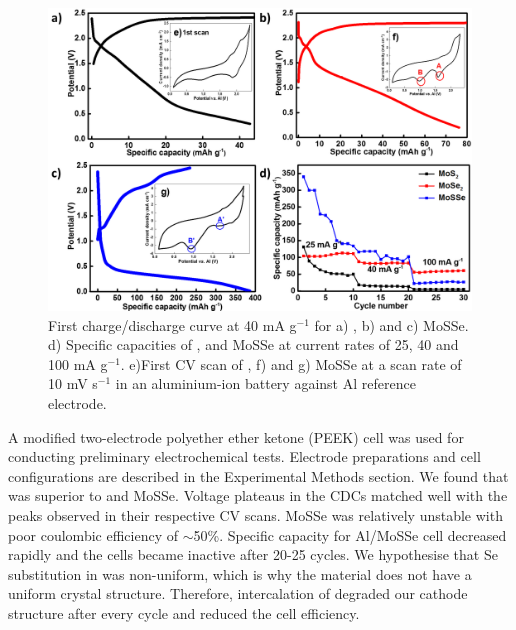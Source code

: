  \begin{figure}[htb!]
\centering
\includegraphics[width=\textwidth]{Figures/chap4fig/CDCCV}
\caption{First charge/discharge curve at 40 mA g$^{-1}$ for a) , b)  and c) MoSSe. d) Specific capacities of ,  and MoSSe at current rates of 25, 40 and 100 mA g$^{-1}$. e)First CV scan of , f)  and g) MoSSe at a scan rate of 10 mV s$^{-1}$ in an aluminium-ion battery against Al reference electrode.}
\label{Figures/chap4fig:CDCCV}
\end{figure} 
A modified two-electrode polyether ether ketone (PEEK) cell was used for conducting preliminary electrochemical tests. Electrode preparations and cell configurations are described in the Experimental Methods section. We found that  was superior to  and MoSSe. Voltage plateaus in the CDCs matched well with the peaks observed in their respective CV scans. MoSSe was relatively unstable with poor coulombic efficiency of $\sim$50\%. Specific capacity for Al/MoSSe cell decreased rapidly and the cells became inactive after 20-25 cycles. We hypothesise that Se substitution in  was non-uniform, which is why the material does not have a uniform crystal structure. Therefore, intercalation of  degraded our cathode structure after every cycle and reduced the cell efficiency.
